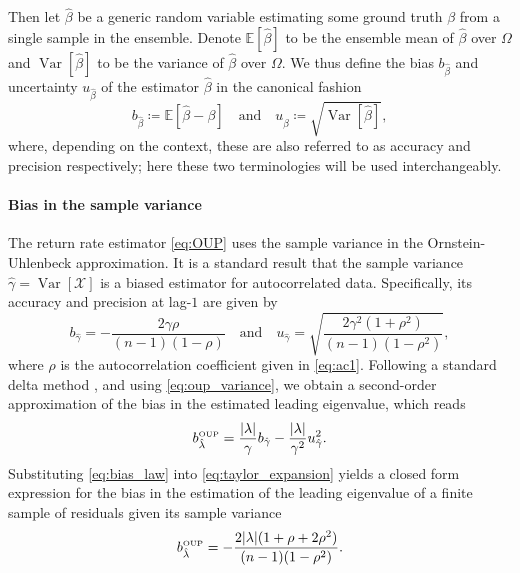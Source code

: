 \documentclass[openacc]{rsproca_new}
\newcommand{\Var}{\operatorname{Var}}
\newcommand{\E}{\mathbb{E}}
\begin{document}
Then let $\hat \beta$ be a generic random variable estimating some ground truth $\beta$ from a single sample in the ensemble.
Denote $\E[\hat \beta]$ to be the ensemble mean of $\hat\beta$ over $\Omega$ and $\Var[\hat\beta]$ to be the variance of $\hat\beta$ over $\Omega$.
We thus define the bias $b_{\hat\beta}$ and uncertainty $u_{\hat\beta}$ of the estimator $\hat\beta$ in the canonical fashion
%
\begin{equation}\label{eq:bias_and_uncertainty}
  b_{\hat\beta}\coloneqq\E[\hat\beta - \beta] \quad \text{and}\quad u_{\hat\beta}\coloneqq\sqrt{\Var[\hat\beta]} ,
\end{equation}
%
where, depending on the context, these are also referred to as accuracy and precision respectively; here these two terminologies will be used interchangeably.

\paragraph{Bias in the sample variance}
The return rate estimator \eqref{eq:OUP} uses the sample variance in the Ornstein-Uhlenbeck approximation.
It is a standard result that the sample variance $\hat\gamma=\Var[\mathcal{X}]$ is a biased estimator for autocorrelated data.
Specifically, its accuracy and precision at lag-$1$ are given by \cite[Eq.~$(4.6)$]{Law1991}
%
\begin{equation}\label{eq:bias_law}
  b_{\hat\gamma} = -\frac{2\gamma\rho}{(n-1)(1-\rho)}\quad \text{and} \quad u_{\hat\gamma} = \sqrt{\frac{2\gamma^2(1+\rho^2)}{(n-1)(1-\rho^2)}},
\end{equation}
%
where $\rho$ is the autocorrelation coefficient given in \eqref{eq:ac1}.
Following a standard delta method \cite[\S~$5.5.4$]{Casella2024}, and using \eqref{eq:oup_variance}, we obtain a second-order approximation of the bias in the estimated leading eigenvalue, which reads
%
\begin{equation}\label{eq:taylor_expansion}
  b_{\hat\lambda}^{\text{\tiny OUP}} = \frac{|\lambda|}{\gamma}b_{\hat\gamma} - \frac{|\lambda|}{\gamma^2}u^2_{\hat\gamma}.
\end{equation}
%
Substituting \eqref{eq:bias_law} into \eqref{eq:taylor_expansion} yields a closed form expression for the bias in the estimation of the leading eigenvalue of a finite sample of residuals given its sample variance
%
\begin{equation}\label{eq:OUP_bias}
  b_{\hat\lambda}^{\text{\tiny OUP}} = -\frac{2|\lambda|(1+\rho+2\rho^2)}{(n-1)(1-\rho^2)}.
\end{equation}
%
\end{document}

